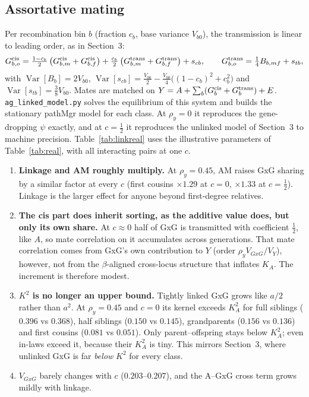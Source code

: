 \documentclass[11pt]{article}
\newcommand{\Var}{\operatorname{Var}}
\begin{document}
\subsection{Assortative mating}
Per recombination bin $b$ (fraction $c_b$, base variance $V_{b0}$), the transmission is linear to leading order, as
in Section~3:
\[
G^{\rm cis}_{b,o}=\tfrac{1-c_b}{2}\left(G^{\rm cis}_{b,m}+G^{\rm cis}_{b,f}\right)+\tfrac{c_b}{2}\left(G^{\rm trans}_{b,m}+G^{\rm trans}_{b,f}\right)+s_{cb},
\qquad G^{\rm trans}_{b,o}=\tfrac14B_{b,mf}+s_{tb},
\]
with $\Var[B_b]=2V_{b0}$, $\Var[s_{cb}]=\frac{V_{b0}}{2}-\frac{V_{b0}}{4}\big((1-c_b)^2+c_b^2\big)$ and
$\Var[s_{tb}]=\frac38V_{b0}$. Mates are matched on $Y=A+\sum_b(G^{\rm cis}_b+G^{\rm trans}_b)+E$.
\texttt{ag\_linked\_model.py} solves the equilibrium of this system and builds the stationary pathMgr model for
each class. At $\rho_y=0$ it reproduces the gene-dropping $\psi$ exactly, and at $c=\frac12$ it reproduces
the unlinked model of Section~3 to machine precision. Table~\ref{tab:linkreal} uses the illustrative
parameters of Table~\ref{tab:real}, with all interacting pairs at one $c$.
\begin{enumerate}
  \item \textbf{Linkage and AM roughly multiply.} At $\rho_y=0.45$, AM raises GxG sharing by a similar factor
    at every $c$ (first cousins $\times1.29$ at $c=0$, $\times1.33$ at $c=\frac12$). Linkage is the larger
    effect for anyone beyond first-degree relatives.
  \item \textbf{The cis part does inherit sorting, as the additive value does, but only its own share.} At
    $c\approx0$ half of GxG is transmitted with coefficient $\frac12$, like $A$, so mate correlation on it
    accumulates across generations. That mate correlation comes from GxG's own contribution to $Y$
    (order $\rho_y V_{GxG}/V_Y$), however, not from the $\beta$-aligned cross-locus structure that inflates
    $K_A$. The increment is therefore modest.
  \item \textbf{$K^2$ is no longer an upper bound.} Tightly linked GxG grows like $a/2$ rather than $a^2$.
    At $\rho_y=0.45$ and $c=0$ its kernel exceeds $K_A^2$ for full siblings ($0.396$ vs $0.368$), half
    siblings ($0.150$ vs $0.145$), grandparents ($0.156$ vs $0.136$) and first cousins ($0.081$ vs $0.051$).
    Only parent--offspring stays below $K_A^2$; even in-laws exceed it, because their $K_A^2$ is tiny. This mirrors Section~3, where unlinked GxG
    is far \emph{below} $K^2$ for every class.
  \item $V_{GxG}$ barely changes with $c$ ($0.203$--$0.207$), and the A--GxG cross term grows mildly with
    linkage.
\end{enumerate}
\end{document}
